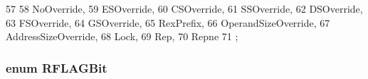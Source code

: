 \begin{DoxyCode}
57                   {
58         NoOverride,
59         ESOverride,
60         CSOverride,
61         SSOverride,
62         DSOverride,
63         FSOverride,
64         GSOverride,
65         RexPrefix,
66         OperandSizeOverride,
67         AddressSizeOverride,
68         Lock,
69         Rep,
70         Repne
71     };
\end{DoxyCode}
\hypertarget{namespaceX86ISA_a62679c97fcb78e0d10a9d535fa1872ff}{
\subsubsection[{RFLAGBit}]{\setlength{\rightskip}{0pt plus 5cm}enum {\bf RFLAGBit}}}
\label{namespaceX86ISA_a62679c97fcb78e0d10a9d535fa1872ff}
